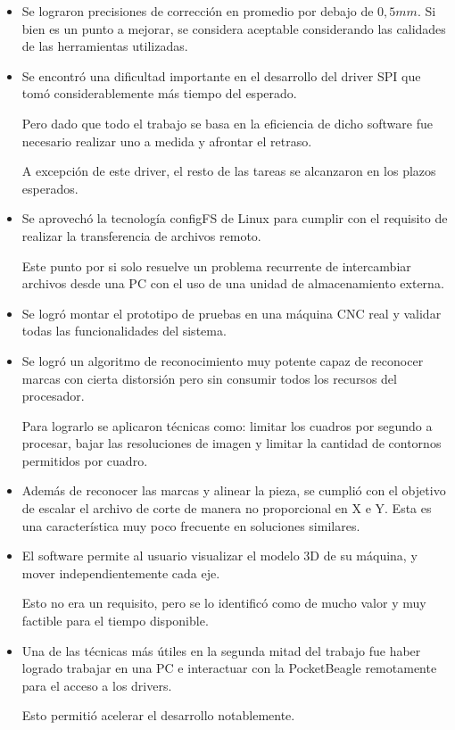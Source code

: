 \begin{itemize}
   \item{Se lograron precisiones de corrección en promedio por debajo de $0,5mm$. Si bien es un punto a mejorar, se considera aceptable considerando las calidades de las herramientas utilizadas.}

   \item{Se encontró una dificultad importante en el desarrollo del driver SPI que tomó considerablemente más tiempo del esperado. \par
      Pero dado que todo el trabajo se basa en la eficiencia de dicho software fue necesario realizar uno a medida y afrontar el retraso.\par
   A excepción de este driver, el resto de las tareas se alcanzaron en los plazos esperados.}
   
   \item{Se aprovechó la tecnología configFS de Linux para cumplir con el requisito de realizar la transferencia de archivos remoto.\par
      Este punto por si solo resuelve un problema recurrente de intercambiar archivos desde una PC con el uso de una unidad de almacenamiento externa.}

   \item{Se logró montar el prototipo de pruebas en una máquina CNC real y validar todas las funcionalidades del sistema.}

   \item{Se logró un algoritmo de reconocimiento muy potente capaz de reconocer marcas con cierta distorsión pero sin consumir todos los recursos del procesador. \par
      Para lograrlo se aplicaron técnicas como: limitar los cuadros por segundo a procesar, bajar las resoluciones de imagen y limitar la cantidad de contornos permitidos por cuadro.}

   \item{Además de reconocer las marcas y alinear la pieza, se cumplió con el objetivo de escalar el archivo de corte de manera no proporcional en X e Y. Esta es una característica muy poco frecuente en soluciones similares.}

   \item{El software permite al usuario visualizar el modelo 3D de su máquina, y mover independientemente cada eje.\par
      Esto no era un requisito, pero se lo identificó como de mucho valor y muy factible para el tiempo disponible.}

   \item{Una de las técnicas más útiles en la segunda mitad del trabajo fue haber logrado trabajar en una PC e interactuar con la PocketBeagle remotamente para el acceso a los drivers.\par Esto permitió acelerar el desarrollo notablemente.}

\end{itemize}


